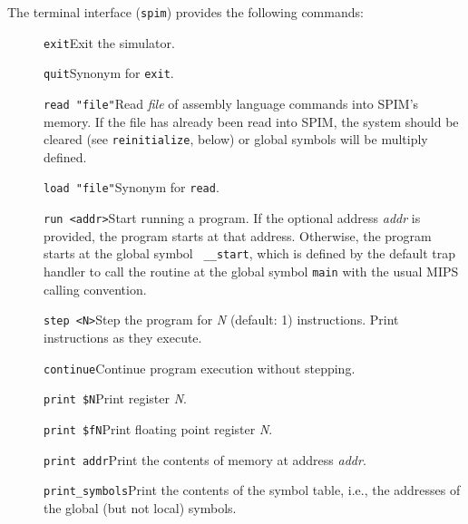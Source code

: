 \documentclass[11pt]{article}
\begin{document}
The terminal interface ({\tt spim}) provides the following commands:
\begin{description}
  \item [] {\tt exit}\newline Exit the simulator.

  \item [] {\tt quit}\newline Synonym for {\tt exit}.

  \item [] {\tt read "file"}\newline Read {\em file\/} of assembly
language commands into SPIM's memory.  If the file has already been
read into SPIM, the system should be cleared (see {\tt reinitialize},
below) or global symbols will be multiply defined.

  \item [] {\tt load "file"}\newline Synonym for {\tt read}.

  \item [] {\tt run <addr>}\newline Start running a program.  If the
optional address {\em addr\/} is provided, the program starts at that
address.  Otherwise, the program starts at the global symbol {\tt
\_\_start}, which is defined by the default trap handler to call the
routine at the global symbol {\tt main} with the usual MIPS calling
convention.

  \item [] {\tt step <N>}\newline Step the program for {\em N\/}
(default: 1) instructions.  Print instructions as they execute.

  \item [] {\tt continue}\newline Continue program execution without
stepping.

  \item [] {\tt print \$N}\newline Print register {\em N\/}.

  \item [] {\tt print \$fN}\newline Print floating point register {\em
N\/}.

  \item [] {\tt print addr}\newline Print the contents of memory at
address {\em addr\/}.

  \item [] {\tt print\_symbols}\newline Print the contents of the symbol
table, i.e., the addresses of the global (but not local) symbols.


\end{description}
\end{document}
